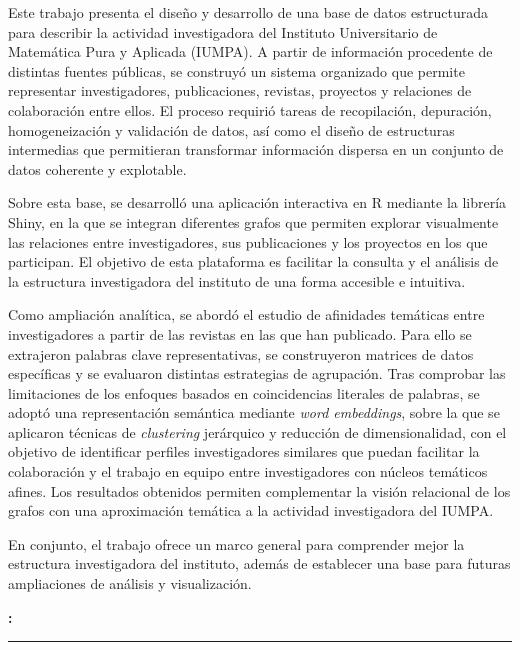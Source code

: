 \documentclass[11pt,spanish,listoffigures,listoftables]{tfgetsinf}
\renewenvironment{abstract}[1][catalan]{%
    \begingroup
    \selectlanguage{#1}\vspace{1em}\par\hfill
    {\sffamily\bfseries\Huge\abstractname}\par
    \vspace{0.5em}
}{%
    \par\noindent\textbf{\keywordsname:} \keywords
    \vspace{0.5em}
    \hrule
    \vspace{1em}
    \endgroup
}
\begin{document}
\begin{abstract}[spanish]
Este trabajo presenta el diseño y desarrollo de una base de datos estructurada para describir la actividad investigadora del Instituto Universitario de Matemática Pura y Aplicada (IUMPA). A partir de información procedente de distintas fuentes públicas, se construyó un sistema organizado que permite representar investigadores, publicaciones, revistas, proyectos y relaciones de colaboración entre ellos. El proceso requirió tareas de recopilación, depuración, homogeneización y validación de datos, así como el diseño de estructuras intermedias que permitieran transformar información dispersa en un conjunto de datos coherente y explotable.

Sobre esta base, se desarrolló una aplicación interactiva en R mediante la librería Shiny, en la que se integran diferentes grafos que permiten explorar visualmente las relaciones entre investigadores, sus publicaciones y los proyectos en los que participan. El objetivo de esta plataforma es facilitar la consulta y el análisis de la estructura investigadora del instituto de una forma accesible e intuitiva.

Como ampliación analítica, se abordó el estudio de afinidades temáticas entre investigadores a partir de las revistas en las que han publicado. Para ello se extrajeron palabras clave representativas, se construyeron matrices de datos específicas y se evaluaron distintas estrategias de agrupación. Tras comprobar las limitaciones de los enfoques basados en coincidencias literales de palabras, se adoptó una representación semántica mediante \textit{word embeddings}, sobre la que se aplicaron técnicas de \textit{clustering} jerárquico y reducción de dimensionalidad, con el objetivo de identificar perfiles investigadores similares que puedan facilitar la colaboración y el trabajo en equipo entre investigadores con núcleos temáticos afines. Los resultados obtenidos permiten complementar la visión relacional de los grafos con una aproximación temática a la actividad investigadora del IUMPA.

En conjunto, el trabajo ofrece un marco general para comprender mejor la estructura investigadora del instituto, además de establecer una base para futuras ampliaciones de análisis y visualización.
\end{abstract}
\end{document}
